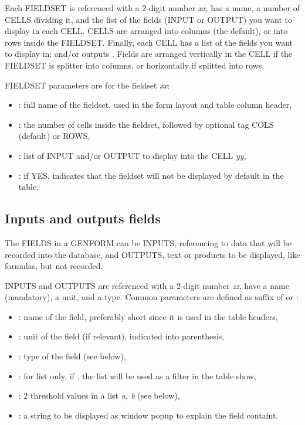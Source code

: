 Each FIELDSET is referenced with a 2-digit number {\it xx}, has a name, a number of CELLS dividing it, and the list of the fields (INPUT or OUTPUT) you want to display in each CELL. CELLS are arranged into columns (the default), or into rows inside the FIELDSET. Finally, each CELL has a list of the fields you want to display in:  and/or outputs . Fields are arranged vertically in the CELL if the FIELDSET is splitter into columns, or horizontally if splitted into rows.

FIELDSET parameters are for the fieldset {\it xx}:
\begin{itemize}
	\item {}: full name of the fieldset, used in the form layout and table column header,
	\item {}: the number of cells inside the fieldset, followed by optional tag COLS (default) or ROWS,
	\item {}: list of INPUT and/or OUTPUT to display into the CELL {\it yy},
	\item {}: if YES, indicates that the fieldset will not be displayed by default in the table.
\end{itemize}

\subsection{Inputs and outputs fields}

The FIELDS in a GENFORM can be INPUTS, referencing to data that will be recorded into the database, and OUTPUTS, text or products to be displayed, like formulas, but not recorded.

INPUTS and OUTPUTS are referenced with a 2-digit number {\it zz}, have a name (mandatory), a unit, and a type. Common parameters are defined as suffix of  or :
\begin{itemize}
	\item {}: name of the field, preferably short since it is used in the table headers,
	\item {}: unit of the field (if relevant), indicated into parenthesis,
	\item {}: type of the field (see below),
	\item {}: for list only, if , the list will be used as a filter in the table show,
	\item {}: 2 threshold values in a list {\it a, b} (see below),
	\item {}: a string to be displayed as window popup to explain the field containt.
\end{itemize}

